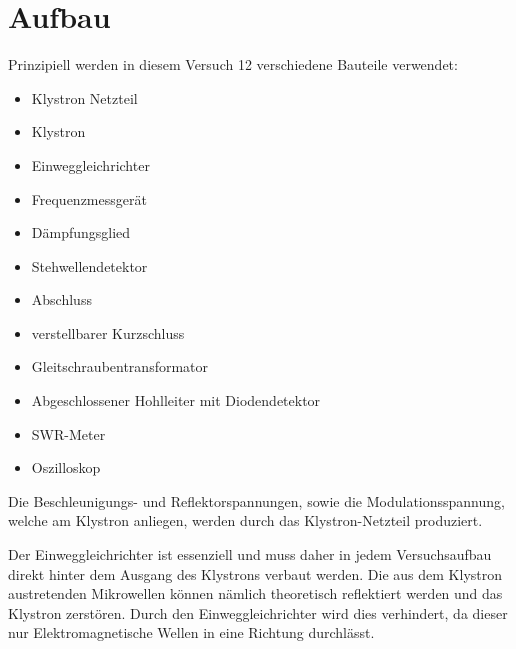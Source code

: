     \section{Aufbau}
        Prinzipiell werden in diesem Versuch 12 verschiedene Bauteile verwendet:
        \begin{itemize}
            \item Klystron Netzteil
            \item Klystron
            \item Einweggleichrichter
            \item Frequenzmessgerät
            \item Dämpfungsglied
            \item Stehwellendetektor
            \item Abschluss
            \item verstellbarer Kurzschluss
            \item Gleitschraubentransformator
            \item Abgeschlossener Hohlleiter mit Diodendetektor
            \item SWR-Meter
            \item Oszilloskop
        \end{itemize}

        Die Beschleunigungs- und Reflektorspannungen, sowie die Modulationsspannung, welche am Klystron anliegen, werden durch das Klystron-Netzteil produziert.

        Der Einweggleichrichter ist essenziell und muss daher in jedem Versuchsaufbau direkt hinter dem Ausgang des Klystrons verbaut werden.
        Die aus dem Klystron austretenden Mikrowellen können nämlich theoretisch reflektiert werden und das Klystron zerstören.
        Durch den Einweggleichrichter wird dies verhindert, da dieser nur Elektromagnetische Wellen in eine Richtung durchlässt.


        
